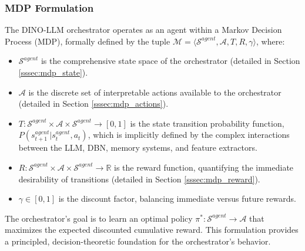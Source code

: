 \documentclass[11pt]{article}
\begin{document}
\subsubsection{MDP Formulation}
\label{sssec:mdp_formulation}
The DINO-LLM orchestrator operates as an agent within a Markov Decision Process (MDP), formally defined by the tuple $\mathcal{M} = \langle \mathcal{S}^{agent}, \mathcal{A}, T, R, \gamma \rangle$, where:
\begin{itemize}
    \item $\mathcal{S}^{agent}$ is the comprehensive state space of the orchestrator (detailed in Section \ref{sssec:mdp_state}).
    \item $\mathcal{A}$ is the discrete set of interpretable actions available to the orchestrator (detailed in Section \ref{sssec:mdp_actions}).
    \item $T: \mathcal{S}^{agent} \times \mathcal{A} \times \mathcal{S}^{agent} \rightarrow [0,1]$ is the state transition probability function, $P(s_{t+1}^{agent} | s_t^{agent}, a_t)$, which is implicitly defined by the complex interactions between the LLM, DBN, memory systems, and feature extractors.
    \item $R: \mathcal{S}^{agent} \times \mathcal{A} \times \mathcal{S}^{agent} \rightarrow \mathbb{R}$ is the reward function, quantifying the immediate desirability of transitions (detailed in Section \ref{sssec:mdp_reward}).
    \item $\gamma \in [0,1]$ is the discount factor, balancing immediate versus future rewards.
\end{itemize}
The orchestrator's goal is to learn an optimal policy $\pi^*: \mathcal{S}^{agent} \rightarrow \mathcal{A}$ that maximizes the expected discounted cumulative reward. This formulation provides a principled, decision-theoretic foundation for the orchestrator's behavior.
\end{document}
